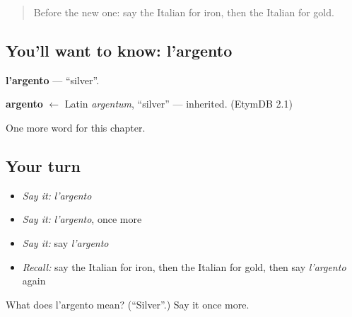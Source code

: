 \label{lesson:IT-C201-argento}



\begin{quote}
Before the new one: say the Italian for iron, then the Italian for gold.
\end{quote}

\subsection*{You'll want to know: l'argento}
\textbf{l'argento} — \textquotedblleft{}silver\textquotedblright{}.

\begin{cousinweb}
\textbf{argento} $\leftarrow$ Latin \emph{argentum}, \textquotedblleft{}silver\textquotedblright{} — inherited. (EtymDB 2.1)
\end{cousinweb}

\begin{grammarlens}[title={What you've built}]
One more word for this chapter.
\end{grammarlens}

\subsection*{Your turn}
\begin{itemize}
\raggedright
  \item \emph{Say it:} \emph{l'argento}
  \item \emph{Say it:} \emph{l'argento}, once more
  \item \emph{Say it:} say \emph{l'argento}
  \item \emph{Recall:} say the Italian for iron, then the Italian for gold, then say \emph{l'argento} again
\end{itemize}

\begin{tcolorbox}[breakable,colback=teal!4,colframe=teal!35!black,title={Before you move on}]
What does l'argento mean? (\textquotedblleft{}Silver\textquotedblright{}.) Say it once more.
\end{tcolorbox}
